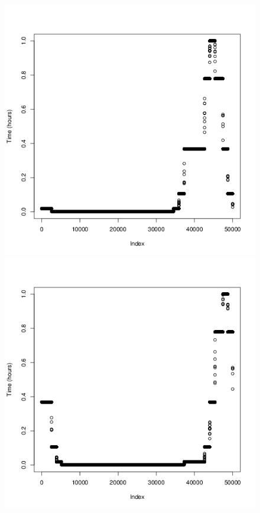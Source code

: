 \documentclass[a4paper, twocolumn]{article}
\begin{document}
\begin{figure}[H]
\begin{minipage}[]{0.2\textwidth}
	    \end{minipage}
	    \begin{minipage}[]{0.2\textwidth}
	    	\includegraphics[width=\textwidth]{share/9_time.png}
	    \end{minipage}
	    \begin{minipage}[]{0.2\textwidth}
	    	\includegraphics[width=\textwidth]{share/10_time.png}

\end{minipage}
\end{figure}
\end{document}
